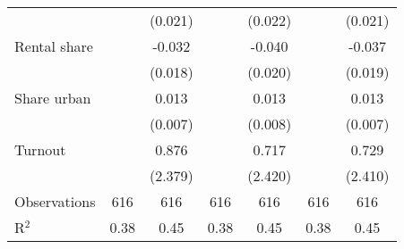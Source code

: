 {\begin{tabular}{l*{6}{c}}
                    &                     &     (0.021)         &                     &     (0.022)         &                     &     (0.021)         \\
\addlinespace
Rental share        &                     &      -0.032\sym{*}  &                     &      -0.040\sym{**} &                     &      -0.037\sym{*}  \\
                    &                     &     (0.018)         &                     &     (0.020)         &                     &     (0.019)         \\
\addlinespace
Share urban         &                     &       0.013\sym{*}  &                     &       0.013         &                     &       0.013\sym{*}  \\
                    &                     &     (0.007)         &                     &     (0.008)         &                     &     (0.007)         \\
\addlinespace
Turnout             &                     &       0.876         &                     &       0.717         &                     &       0.729         \\
                    &                     &     (2.379)         &                     &     (2.420)         &                     &     (2.410)         \\
\midrule
Observations        &         616         &         616         &         616         &         616         &         616         &         616         \\
R$^2$               &        0.38         &        0.45         &        0.38         &        0.45         &        0.38         &        0.45         \\
\bottomrule
\end{tabular}
}
